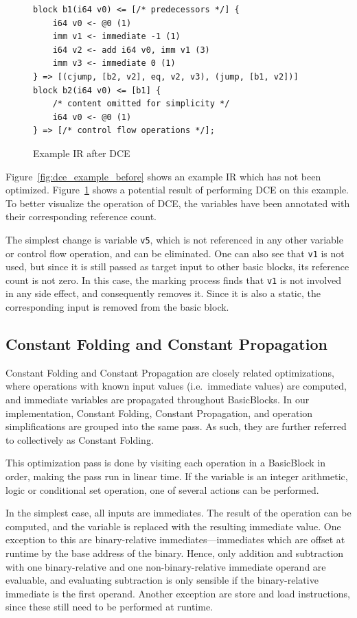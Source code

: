 \documentclass[course=eragp]{aspdoc}
\begin{document}
\begin{figure}[H]
    \centering
    \begin{lstlisting}[]
block b1(i64 v0) <= [/* predecessors */] {
    i64 v0 <- @0 (1)
    imm v1 <- immediate -1 (1)
    i64 v2 <- add i64 v0, imm v1 (3)
    imm v3 <- immediate 0 (1)
} => [(cjump, [b2, v2], eq, v2, v3), (jump, [b1, v2])]
block b2(i64 v0) <= [b1] {
    /* content omitted for simplicity */
    i64 v0 <- @0 (1)
} => [/* control flow operations */];
\end{lstlisting}
    \caption{Example IR after DCE}\label{fig:dce_example_after}
\end{figure}

Figure~\ref{fig:dce_example_before} shows an example IR which has not been optimized. Figure~\ref{fig:dce_example_after}
shows a potential result of performing DCE on this example. To better visualize the operation of DCE, the variables
have been annotated with their corresponding reference count.

The simplest change is variable \texttt{v5}, which is not referenced in any other variable or control flow operation,
and can be eliminated. One can also see that \texttt{v1} is not used, but since it is still passed as target input to
other basic blocks, its reference count is not zero. In this case, the marking process finds that \texttt{v1} is not
involved in any side effect, and consequently removes it. Since it is also a static, the corresponding input is removed
from the basic block.

\subsection{Constant Folding and Constant Propagation}\label{constant_folding}

Constant Folding and Constant Propagation are closely related optimizations, where operations with known input values
(i.e.\ immediate values) are computed, and immediate variables are propagated throughout BasicBlocks.
In our implementation, Constant Folding, Constant Propagation, and operation simplifications are grouped into the same
pass.  As such, they are further referred to collectively as Constant Folding.

This optimization pass is done by visiting each operation in a BasicBlock in order, making the pass run in linear time.
If the variable is an integer arithmetic, logic or conditional set operation, one of several actions can be performed.

In the simplest case, all inputs are immediates. The result of the operation can be computed, and the variable is
replaced with the resulting immediate value. One exception to this are binary-relative immediates---immediates which are
offset at runtime by the base address of the binary. Hence, only addition and subtraction with one binary-relative and
one non-binary-relative immediate operand are evaluable, and evaluating subtraction is only sensible if the
binary-relative immediate is the first operand. Another exception are store and load instructions, since these still
need to be performed at runtime.
\end{document}
